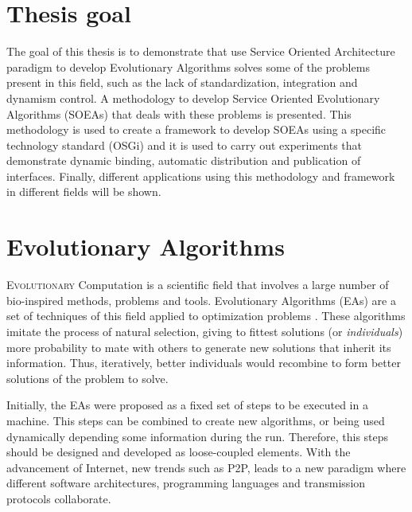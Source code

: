 \label{chap:introduction}
\minitoc\mtcskip
\vfill



\section{Thesis goal} %
The goal of this thesis is to demonstrate that use Service Oriented Architecture paradigm to develop Evolutionary Algorithms solves some of the problems present in this field, such as the lack of standardization, integration and dynamism control. A methodology to develop Service Oriented Evolutionary Algorithms (SOEAs) that deals with these problems is presented. This methodology is used to create a framework to develop SOEAs using a specific technology standard (OSGi) and it is used to carry out experiments that demonstrate dynamic binding, automatic distribution and publication of interfaces. Finally, different applications using this methodology and framework in different fields will be shown.

\section{Evolutionary Algorithms}
\label{sec:intro:eas}

\lettrine{E}{volutionary} Computation is a scientific field that involves a large number of bio-inspired methods, problems and tools. Evolutionary Algorithms (EAs) are a set of techniques of this field applied to optimization problems \cite{eiben2010whatis}. These algorithms imitate the process of natural selection, giving to fittest solutions (or {\em individuals}) more probability to mate with others to generate new solutions that inherit its information. Thus, iteratively, better individuals would recombine to form better solutions of the problem to solve.

Initially, the EAs were proposed as a fixed set of steps to be executed in a machine. This steps can be combined to create new algorithms, or being used dynamically depending some information during the run. Therefore, this steps should be designed and developed as loose-coupled elements. With the advancement of Internet, new trends such as P2P, leads to a new paradigm where different software architectures, programming languages and transmission protocols collaborate. 

